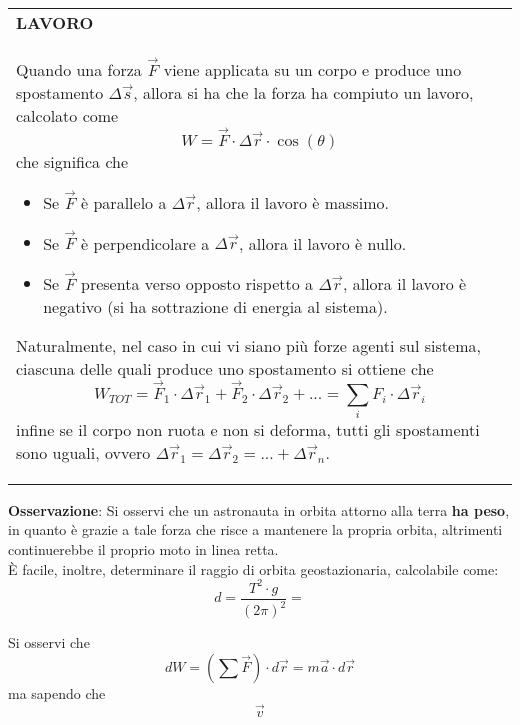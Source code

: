 \documentclass[a4paper]{extarticle}
\renewcommand\arraystretch{}
\begin{document}
\vspace{1em}
\setlength{\tabcolsep}{14pt}
\renewcommand{\arraystretch}{2}
\noindent
\begin{tabularx}{\textwidth}{@{}|P|@{}}
    \hline
    {\textbf{LAVORO}}\\
    \parbox{\linewidth}{Quando una forza $\vec F$ viene applicata su un corpo e produce uno spostamento $\Delta \vec s$, allora si ha che la forza ha compiuto un lavoro, calcolato come
    \[\boxed{W = \vec F \cdot \Delta \vec r \cdot \cos(\theta)}\]
    che significa che
    \begin{itemize}
      \item Se $\vec F$ è parallelo a $\Delta \vec r$, allora il lavoro è massimo.
      \item Se $\vec F$ è perpendicolare a $\Delta \vec r$, allora il lavoro è nullo.
      \item Se $\vec F$ presenta verso opposto rispetto a $\Delta \vec r$, allora il lavoro è negativo (si ha sottrazione di energia al sistema).
    \end{itemize}
    Naturalmente, nel caso in cui vi siano più forze agenti sul sistema, ciascuna delle quali produce uno spostamento si ottiene che
    \[W_{TOT} = \vec F_1 \cdot \Delta \vec r_1 + \vec F_2 \cdot \Delta \vec r_2 + ... = \sum_{i} F_i \cdot \Delta \vec r_i\]
    infine se il corpo non ruota e non si deforma, tutti gli spostamenti sono uguali, ovvero $\Delta \vec r_1 = \Delta \vec r_2 = ... + \Delta \vec r_n$.
     \vspace{3mm}}\\
    \hline
\end{tabularx}

\vspace{1em}
\noindent
\textbf{Osservazione}: Si osservi che un astronauta in orbita attorno alla terra \textbf{ha peso}, in quanto è grazie a tale forza che risce a mantenere la propria orbita, altrimenti continuerebbe il proprio moto in linea retta.\\
È facile, inoltre, determinare il raggio di orbita geostazionaria, calcolabile come:
\[d=\frac{T^2 \cdot g}{(2 \pi)^2} = \]

\vspace{1em}
\noindent
Si osservi che
\[dW = \left(\sum \vec F\right) \cdot d \vec r = m \vec a \cdot d \vec r\]
ma sapendo che
\[\vec v \]
\end{document}

